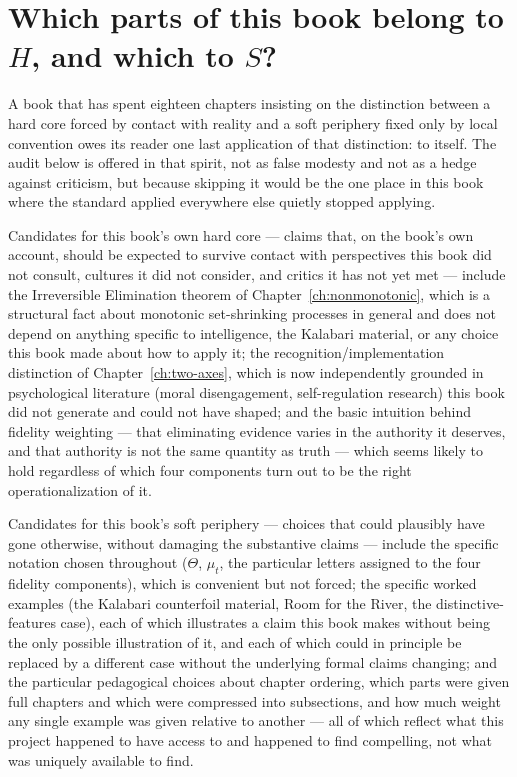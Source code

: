 \section{Which parts of this book belong to $H$, and which to $S$?}

A book that has spent eighteen chapters insisting on the distinction between a hard core forced by contact with reality and a soft periphery fixed only by local convention owes its reader one last application of that distinction: to itself. The audit below is offered in that spirit, not as false modesty and not as a hedge against criticism, but because skipping it would be the one place in this book where the standard applied everywhere else quietly stopped applying.

Candidates for this book's own hard core --- claims that, on the book's own account, should be expected to survive contact with perspectives this book did not consult, cultures it did not consider, and critics it has not yet met --- include the Irreversible Elimination theorem of Chapter~\ref{ch:nonmonotonic}, which is a structural fact about monotonic set-shrinking processes in general and does not depend on anything specific to intelligence, the Kalabari material, or any choice this book made about how to apply it; the recognition/implementation distinction of Chapter~\ref{ch:two-axes}, which is now independently grounded in psychological literature (moral disengagement, self-regulation research) this book did not generate and could not have shaped; and the basic intuition behind fidelity weighting --- that eliminating evidence varies in the authority it deserves, and that authority is not the same quantity as truth --- which seems likely to hold regardless of which four components turn out to be the right operationalization of it.

Candidates for this book's soft periphery --- choices that could plausibly have gone otherwise, without damaging the substantive claims --- include the specific notation chosen throughout ($\Theta$, $\mu_t$, the particular letters assigned to the four fidelity components), which is convenient but not forced; the specific worked examples (the Kalabari counterfoil material, Room for the River, the distinctive-features case), each of which illustrates a claim this book makes without being the only possible illustration of it, and each of which could in principle be replaced by a different case without the underlying formal claims changing; and the particular pedagogical choices about chapter ordering, which parts were given full chapters and which were compressed into subsections, and how much weight any single example was given relative to another --- all of which reflect what this project happened to have access to and happened to find compelling, not what was uniquely available to find.

